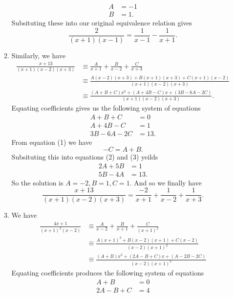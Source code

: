 \documentclass[12pt,oneside]{book}
\begin{document}
\begin{enumerate}
\begin{enumerate}
\begin{align*}
                A &= -1 \\
                B &= 1.
            \end{align*}
            Subsituting these into our original equivalence relation gives \[
                \frac{2}{(x+1)(x-1)} = \frac{1}{x-1}  - \frac{1}{x+1}
            .\] 
            \item Similarly, we have \begin{align*}
                \frac{x+13}{(x+1)(x-2)(x+3)} &\equiv \frac{A}{x+1} + \frac{B}{x-2} + \frac{C}{x+3} \\
                &\equiv \frac{A(x-2)(x+3) + B(x+1)(x+3) + C(x+1)(x-2)}{(x+1)(x-2)(x+3)} \\
                &\equiv \frac{(A+B+C)x^2 + (A+4B-C)x+(3B-6A-2C)}{(x+1)(x-2)(x+3)}.
            \end{align*}
            Equating coefficients gives us the following system of equations \begin{align*}
                A + B + C &= 0 \\
                A + 4B - C &= 1 \\
                3B - 6A - 2C &= 13.
            \end{align*}
            From equation (1) we have \[
                - C = A + B
            .\] Subsituting this into equations (2) and (3) yeilds \begin{align*}
                2A + 5B &= 1 \\
                5B - 4A &= 13.
            \end{align*}
            So the solution is $A = -2, B = 1, C = 1$. And so we finally have \[
                \frac{x+13}{(x+1)(x-2)(x+3)} = \frac{-2}{x+1} + \frac{1}{x-2} + \frac{1}{x+3}
            .\] 
            \item We have \begin{align*}
                \frac{4x+1}{(x+1)^2(x-2)} &\equiv \frac{A}{x-2} + \frac{B}{x+1} + \frac{C}{(x+1)^2} \\
                &\equiv \frac{A(x+1)^2 + B(x-2)(x+1) + C(x-2)}{(x-2)(x+1)^2} \\
                &\equiv \frac{(A + B)x^2 + (2A - B + C)x + (A - 2B - 2C)}{(x-2)(x+1)^2}
            \end{align*}
            Equating coefficients produces the following system of equations \begin{align*}
                A + B &= 0 \\
                2A - B + C &= 4 \\

\end{align*}
\end{enumerate}
\end{enumerate}
\end{document}
